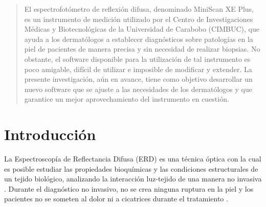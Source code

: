 \documentclass[conference]{IEEEtran}
\begin{document}
\begin{abstract}
El espectrofot\'{o}metro de reflexi\'{o}n difusa, denominado MiniScan XE Plus, es un instrumento de medici\'{o}n utilizado por el Centro de Investigaciones M\'{e}dicas y Biotecnol\'{o}gicas de la Universidad de Carabobo (CIMBUC), que ayuda a los dermat\'{o}logos a establecer diagn\'{o}sticos sobre patolog\'{i}as en la piel de pacientes de manera precisa y sin necesidad de realizar biopsias. No obstante, el software disponible para la utilizaci\'{o}n de tal instrumento es poco amigable, dif\'{i}cil de utilizar e imposible de modificar y extender. La presente investigaci\'{o}n, a\'{u}n en avance, tiene como objetivo desarrollar un nuevo software que se ajuste a las necesidades de los dermat\'{o}logos y que garantice un mejor aprovechamiento del instrumento en cuesti\'{o}n.
\end{abstract}





%

\section{Introducci\'{o}n}

La Espectroscop\'{i}a de Reflectancia Difusa (ERD) es una t\'{e}cnica \'{o}ptica con la cual es  posible estudiar las propiedades bioqu\'{i}micas y las condiciones estructurales de un tejido biol\'{o}gico, analizando la interacci\'{o}n luz-tejido de una manera no invasiva \cite{Perez}. Durante el diagn\'{o}stico no invasivo, no se crea ninguna ruptura en la piel y los pacientes no se someten al dolor ni a cicatrices durante el tratamiento \cite{Bersha}.
\end{document}
